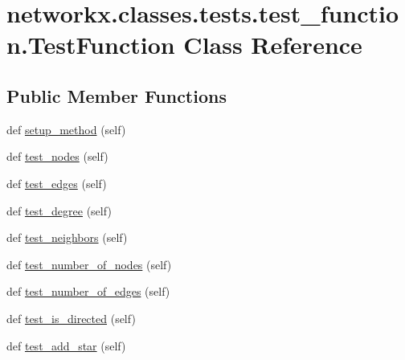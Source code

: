 \hypertarget{classnetworkx_1_1classes_1_1tests_1_1test__function_1_1TestFunction}{}\section{networkx.\+classes.\+tests.\+test\+\_\+function.\+Test\+Function Class Reference}
\label{classnetworkx_1_1classes_1_1tests_1_1test__function_1_1TestFunction}
\subsection*{Public Member Functions}
\begin{DoxyCompactItemize}
\item 
def \hyperlink{classnetworkx_1_1classes_1_1tests_1_1test__function_1_1TestFunction_a3ab2122deb2d236c2ec2a27c120e4452}{setup\+\_\+method} (self)
\item 
def \hyperlink{classnetworkx_1_1classes_1_1tests_1_1test__function_1_1TestFunction_a883a4a4377ccc9ca834879b7ff01ea26}{test\+\_\+nodes} (self)
\item 
def \hyperlink{classnetworkx_1_1classes_1_1tests_1_1test__function_1_1TestFunction_af115157dfa87b0921db5b2be993721bb}{test\+\_\+edges} (self)
\item 
def \hyperlink{classnetworkx_1_1classes_1_1tests_1_1test__function_1_1TestFunction_af31712975ffb9524992cdcb697eb977f}{test\+\_\+degree} (self)
\item 
def \hyperlink{classnetworkx_1_1classes_1_1tests_1_1test__function_1_1TestFunction_a816c5dda9722174e557606dbab03ea3e}{test\+\_\+neighbors} (self)
\item 
def \hyperlink{classnetworkx_1_1classes_1_1tests_1_1test__function_1_1TestFunction_a244bd126871a35987405f31066219a53}{test\+\_\+number\+\_\+of\+\_\+nodes} (self)
\item 
def \hyperlink{classnetworkx_1_1classes_1_1tests_1_1test__function_1_1TestFunction_aa5550bcdaf76c05ec99c4c7b3f2bc2b6}{test\+\_\+number\+\_\+of\+\_\+edges} (self)
\item 
def \hyperlink{classnetworkx_1_1classes_1_1tests_1_1test__function_1_1TestFunction_a43e213d95f45b96dd12eb9c4e137f414}{test\+\_\+is\+\_\+directed} (self)
\item 
def \hyperlink{classnetworkx_1_1classes_1_1tests_1_1test__function_1_1TestFunction_afb07dd88d1294d662bf5f985c78740b2}{test\+\_\+add\+\_\+star} (self)
\item 

\end{DoxyCompactItemize}
